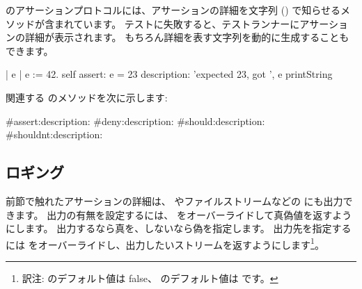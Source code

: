 \documentclass[a4paper,10pt,twoside]{book}
\begin{document}
 のアサーションプロトコルには、アサーションの詳細を文字列 () で知らせるメソッドが含まれています。
テストに失敗すると、テストランナーにアサーションの詳細が表示されます。
もちろん詳細を表す文字列を動的に生成することもできます。
\begin{code}{}
| e |
e := 42.
self assert: e = 23
	description: 'expected 23, got ', e printString
\end{code}

関連する  のメソッドを次に示します:
\begin{code}{}
#assert:description:
#deny:description:
#should:description:
#shouldnt:description:
\end{code}

\subsection{ロギング}
前節で触れたアサーションの詳細は、 やファイルストリームなどの  にも出力できます。
出力の有無を設定するには、 をオーバーライドして真偽値を返すようにします。
出力するなら真を、しないなら偽を指定します。
出力先を指定するには  をオーバーライドし、出力したいストリームを返すようにします\footnote{訳注:  のデフォルト値は false、 のデフォルト値は  です。}。

\end{document}
